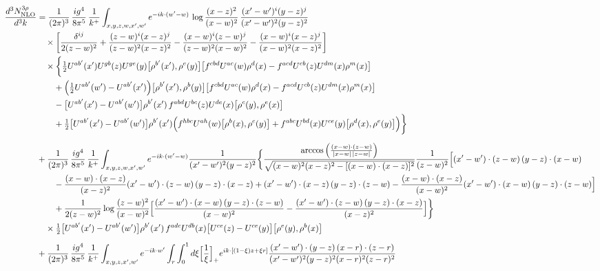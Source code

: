 \documentclass[10pt]{article}
\begin{document}
\begin{align}
\frac{d^{3}N^{3\rho}_{\rm NLO}}{d^{3}k}&=\frac{1}{(2\pi)^{3}}\,\frac{ig^{4}}{8\pi^{5}}\,\frac{1}{k^{+}}\int_{x,y,z,w,x',w'}e^{-ik\cdot(w'-w)}\,\log\frac{(x-z)^{2}}{(x-w)^{2}}\,\frac{(x'-w')^{i}(y-z)^{j}}{(x'-w')^{2}(y-z)^{2}}\notag\\
&\quad\times\bigg[\frac{\delta^{ij}}{2(z-w)^{2}}+\frac{(z-w)^{i}(x-z)^{j}}{(z-w)^{2}(x-z)^{2}}-\frac{(x-w)^{i}(z-w)^{j}}{(z-w)^{2}(x-w)^{2}}-\frac{(x-w)^{i}(x-z)^{j}}{(x-w)^{2}(x-z)^{2}}\bigg]\notag\\
&\quad\times\bigg\{\tfrac12U^{ab'}(x')U^{gb}(z)U^{ge}(y)\big[\rho^{b'}(x'),\rho^{e}(y)\big]\big[f^{cbd}U^{ac}(w)\rho^{d}(x)-f^{acd}U^{cb}(z)U^{dm}(x)\rho^{m}(x)\big]\notag\\
&\qquad+\Big(\tfrac12U^{ab'}(w')-U^{ab'}(x')\Big)\big[\rho^{b'}(x'),\rho^{b}(y)\big]\big[f^{cbd}U^{ac}(w)\rho^{d}(x)-f^{acd}U^{cb}(z)U^{dm}(x)\rho^{m}(x)\big]\notag\\
&\qquad-\big[U^{ab'}(x')-U^{ab'}(w')\big]\rho^{b'}(x')\,f^{abd}U^{bc}(z)U^{de}(x)\big[\rho^{c}(y),\rho^{e}(x)\big]\notag\\
&\qquad+\tfrac12\big[U^{ab'}(x')-U^{ab'}(w')\big]\rho^{b'}(x')\Big(f^{hbc}U^{ah}(w)\big[\rho^{b}(x),\rho^{c}(y)\big]+f^{abc}U^{bd}(x)U^{ce}(y)\big[\rho^{d}(x),\rho^{e}(y)\big]\Big)\bigg\}\notag\\[6pt]
&+\frac{1}{(2\pi)^{3}}\,\frac{ig^{4}}{8\pi^{5}}\,\frac{1}{k^{+}}\int_{x,y,z,w,x',w'}e^{-ik\cdot(w'-w)}\frac{1}{(x'-w')^{2}(y-z)^{2}}\bigg\{\frac{\arccos\Big(\frac{(x-w)\cdot(z-w)}{|x-w|\,|z-w|}\Big)}{\sqrt{(x-w)^{2}(x-z)^{2}-[(x-w)\cdot(x-z)]^{2}}}\frac{1}{(z-w)^{2}}\Big[(x'-w')\cdot(z-w)\,(y-z)\cdot(x-w)\notag\\
&\qquad-\frac{(x-w)\cdot(x-z)}{(x-z)^{2}}(x'-w')\cdot(z-w)\,(y-z)\cdot(x-z)+(x'-w')\cdot(x-z)\,(y-z)\cdot(z-w)-\frac{(x-w)\cdot(x-z)}{(x-w)^{2}}(x'-w')\cdot(x-w)\,(y-z)\cdot(z-w)\Big]\notag\\
&\qquad+\frac{1}{2(z-w)^{2}}\log\frac{(z-w)^{2}}{(x-w)^{2}}\Big[\frac{(x'-w')\cdot(x-w)\,(y-z)\cdot(z-w)}{(x-w)^{2}}-\frac{(x'-w')\cdot(z-w)\,(y-z)\cdot(x-z)}{(x-z)^{2}}\Big]\bigg\}\notag\\
&\quad\times\tfrac12\big[U^{ab'}(x')-U^{ab'}(w')\big]\rho^{b'}(x')\,f^{adc}U^{db}(x)\big[U^{ce}(z)-U^{ce}(y)\big]\big[\rho^{e}(y),\rho^{b}(x)\big]\notag\\[6pt]
&+\frac{1}{(2\pi)^{3}}\,\frac{ig^{4}}{8\pi^{5}}\,\frac{1}{k^{+}}\int_{x,y,z,x',w'}e^{-ik\cdot w'}\int_{r}\int_{0}^{1}d\xi\Big[\frac1\xi\Big]_{+}e^{ik\cdot[(1-\xi)z+\xi r]}\frac{(x'-w')\cdot(y-z)\,(x-r)\cdot(z-r)}{(x'-w')^{2}(y-z)^{2}(x-r)^{2}(z-r)^{2}}\notag\\

\end{align}
\end{document}
